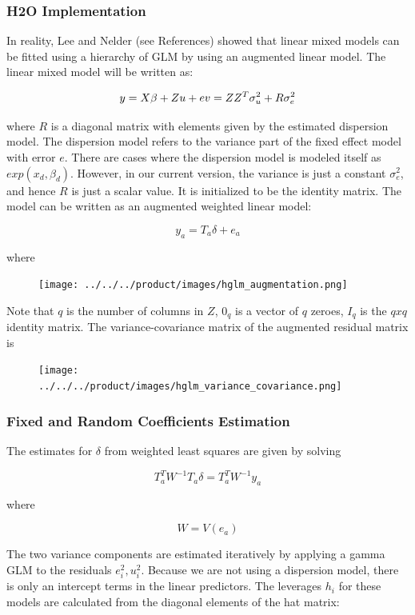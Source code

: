 \subsubsection{H2O Implementation}

In reality, Lee and Nelder (see References) showed that linear mixed models can be fitted using a hierarchy of GLM by using an augmented linear model. The linear mixed model will be written as:

$$y = X\beta + Zu + e \\
v = ZZ^T\sigma_u^2 + R\sigma_e^2$$

where $R$ is a diagonal matrix with elements given by the estimated dispersion model. The dispersion model refers to the variance part of the fixed effect model with error $e$. There are cases where the dispersion model is modeled itself as $exp(x_d, \beta_d)$. However, in our current version, the variance is just a constant $\sigma_e^2$, and hence $R$ is just a scalar value. It is initialized to be the identity matrix. The model can be written as an augmented weighted linear model:

$$y_a = T_a \delta + e_a$$

where

\begin{figure}[H]
\centering
\texttt{[image: ../../../product/images/hglm\_augmentation.png]}
\end{figure}

Note that $q$ is the number of columns in $Z$, $0_q$ is a vector of $q$ zeroes, $I_q$ is the $qxq$ identity matrix. The variance-covariance matrix of the augmented residual matrix is

\begin{figure}[H]
\centering
\texttt{[image: ../../../product/images/hglm\_variance\_covariance.png]}
\end{figure}

\subsubsection{Fixed and Random Coefficients Estimation}

The estimates for $\delta$ from weighted least squares are given by solving

$$T_a^T W^{-1} T_a \delta=T_a^T W^{-1} y_a$$

where

$$W= V(e_a )$$

The two variance components are estimated iteratively by applying a gamma GLM to the residuals $e_i^2,u_i^2$. Because we are not using a dispersion model, there is only an intercept terms in the linear predictors. The leverages $h_i$ for these models are calculated from the diagonal elements of the hat matrix:

